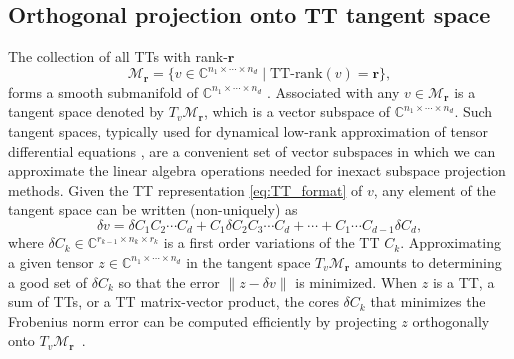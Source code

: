 \documentclass[10pt,preprint]{elsarticle}
\def\M{\mathcal{M}}
\def\r{\bm r}
\begin{document}
\begin{appendices}
\section{Orthogonal projection onto TT tangent space} \label{sec:tangent_proj}
The collection of all TTs with rank-$\r$ 
\begin{equation}
\label{TT-mfld}
\mathcal{M}_{\bm r} = \{v \in \mathbb{C}^{n_1\times \cdots \times n_d}  \mid  \text{TT-rank}(v) = \bm r\},
\end{equation}
forms a smooth submanifold of $\mathbb{C}^{n_1 \times \cdots \times n_d}$ \cite{TT-mfld}. Associated with any $v \in \M_{\r}$ is a tangent space denoted by $T_{v}\M_{\r}$, which is a vector subspace of $\mathbb{C}^{n_1 \times \cdots \times n_d}$. Such tangent spaces, typically used for dynamical low-rank approximation of tensor differential equations \cite{Lubich2015,Haegeman2016}, are a convenient set of vector subspaces in which we can approximate the linear algebra operations needed for inexact subspace projection methods. 
%
Given the TT representation \eqref{eq:TT_format} of $v$, any element of the tangent space can be written (non-uniquely) as 
\begin{equation}
\label{tangent_element}
    \delta v = \delta C_1 C_2 \cdots C_d + C_1 \delta C_2 C_3 \cdots C_d + \cdots + C_1 \cdots C_{d-1} \delta C_d, 
\end{equation}
where $\delta C_k \in \mathbb{C}^{r_{k-1} \times n_k \times r_k}$ is a first order variations of the TT $C_k$. Approximating a given tensor $z \in \mathbb{C}^{n_1\times \cdots \times n_d}$ in the tangent space $T_v\M_{\r}$ amounts to determining a good set of $\delta C_k$ so that the error $\|z-\delta v\|$ is minimized. When $z$ is a TT, a sum of TTs, or a TT matrix-vector product, the cores $\delta C_k$ that minimizes the Frobenius norm error can be computed efficiently by projecting $z$ orthogonally onto $T_v\M_{\r}$~\cite{Steinlechner2016}. 

\end{appendices}
\end{document}
